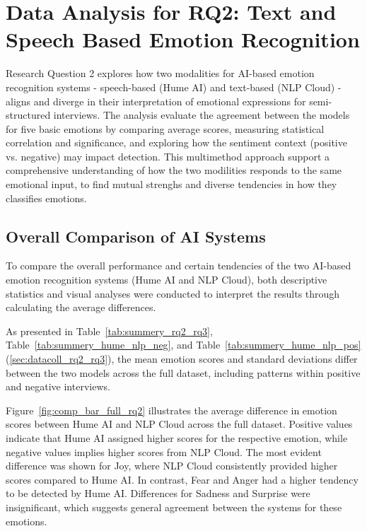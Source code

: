 \section{Data Analysis for RQ2: Text and Speech Based Emotion Recognition}
Research Question 2 explores how two modalities for AI-based emotion recognition systems - speech-based (Hume AI) and text-based (NLP Cloud) - aligns and diverge in their interpretation of emotional expressions for semi-structured interviews. 
The analysis evaluate the agreement between the models for five basic emotions by comparing average scores, measuring statistical correlation and significance, and exploring how the sentiment context (positive vs. negative) may impact detection. 
This multimethod approach support a comprehensive understanding of how the two modilities responds to the same emotional input, to find mutual strenghs and diverse tendencies in how they classifies emotions. 
\subsection{Overall Comparison of AI Systems}
To compare the overall performance and certain tendencies of the two AI-based emotion recognition systems (Hume AI and NLP Cloud),
both descriptive statistics and visual analyses were conducted to interpret the results through calculating the average differences.

As presented in Table~\ref{tab:summery_rq2_rq3}, Table~\ref{tab:summery_hume_nlp_neg}, and Table~\ref{tab:summery_hume_nlp_pos} (\ref{sec:datacoll_rq2_rq3}),
the mean emotion scores and standard deviations differ between the two models across the full dataset,
including patterns within positive and negative interviews. 

Figure~\ref{fig:comp_bar_full_rq2} illustrates the average difference in emotion scores between Hume AI and NLP Cloud across the full dataset. Positive values indicate that Hume AI assigned 
higher scores for the respective emotion, while negative values implies higher scores from NLP Cloud. The most evident difference was shown for Joy, where 
NLP Cloud consistently provided higher scores compared to Hume AI. In contrast, Fear and Anger had a higher tendency to be detected by Hume AI. 
Differences for Sadness and Surprise were insignificant, which suggests general agreement between the systems for these emotions. 

